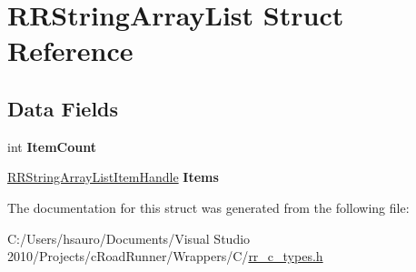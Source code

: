\hypertarget{struct_r_r_string_array_list}{
\section{\-R\-R\-String\-Array\-List \-Struct \-Reference}
\label{struct_r_r_string_array_list}
}
\subsection*{\-Data \-Fields}
\begin{DoxyCompactItemize}
\item 
\hypertarget{struct_r_r_string_array_list_ab970c710c7f3897df3c63f76dc5a0793}{
int {\bfseries \-Item\-Count}}
\label{struct_r_r_string_array_list_ab970c710c7f3897df3c63f76dc5a0793}

\item 
\hypertarget{struct_r_r_string_array_list_a0ef0ac4d72f04a061dc23decb55cb2ae}{
\hyperlink{struct_r_r_string_array_list_item}{\-R\-R\-String\-Array\-List\-Item\-Handle} {\bfseries \-Items}}
\label{struct_r_r_string_array_list_a0ef0ac4d72f04a061dc23decb55cb2ae}

\end{DoxyCompactItemize}


\-The documentation for this struct was generated from the following file\-:\begin{DoxyCompactItemize}
\item 
\-C\-:/\-Users/hsauro/\-Documents/\-Visual Studio 2010/\-Projects/c\-Road\-Runner/\-Wrappers/\-C/\hyperlink{rr__c__types_8h}{rr\-\_\-c\-\_\-types.\-h}\end{DoxyCompactItemize}
